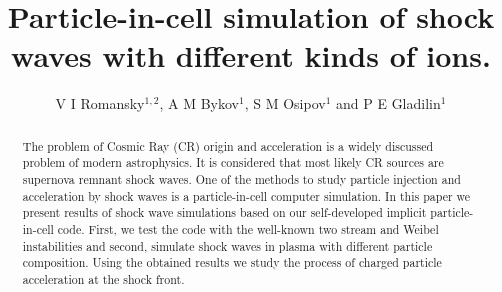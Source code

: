 \documentclass[a4paper]{jpconf}
\begin{document}
\title{Particle-in-cell simulation of shock waves with different kinds of ions.}

\author{V I Romansky$^{1,2}$, A M Bykov$^1$, S M Osipov$^1$ and P E Gladilin$^1$}

\address{$^1$ Ioffe Institute, 26 Politekhnicheskaya st., St. Petersburg 194021, Russia}
\address{$^2$ 
Sternberg Astronomical Institute, Moscow State University
 Universitetsky pr., 13, Moscow 119234, Russia}


\begin{abstract}
The problem of Cosmic Ray (CR) origin and acceleration is a widely discussed problem of
modern astrophysics. It is considered that most likely CR sources are supernova remnant
shock waves. One of the methods to study particle injection and acceleration by shock
waves is a particle-in-cell computer simulation. In this paper we present results of shock
wave simulations based on our self-developed implicit particle-in-cell code. First, we test the code
with the well-known two stream and Weibel instabilities and second, simulate shock waves in
plasma with different particle composition. Using the obtained results we study the
process of charged particle acceleration at the shock front.
\end{abstract}






\end{document}

